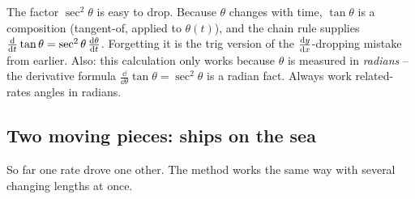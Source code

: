 \begin{trapbox}
The factor $\sec^2\theta$ is easy to drop. Because $\theta$ changes with time, $\tan\theta$ is a
composition (tangent-of, applied to $\theta(t)$), and the chain rule supplies
$\frac{\mathrm{d}}{\mathrm{d} t}\tan\theta = \sec^2\theta\,\frac{\mathrm{d} \theta}{\mathrm{d} t}$. Forgetting it is the trig version of
the $\frac{\mathrm{d} y}{\mathrm{d} x}$-dropping mistake from earlier. Also: this calculation only works because $\theta$ is
measured in \emph{radians} -- the derivative formula $\frac{\dd}{\dd\theta}\tan\theta = \sec^2\theta$
is a radian fact. Always work related-rates angles in radians.
\end{trapbox}

\subsection{Two moving pieces: ships on the sea}

So far one rate drove one other. The method works the same way with several changing lengths at once.

